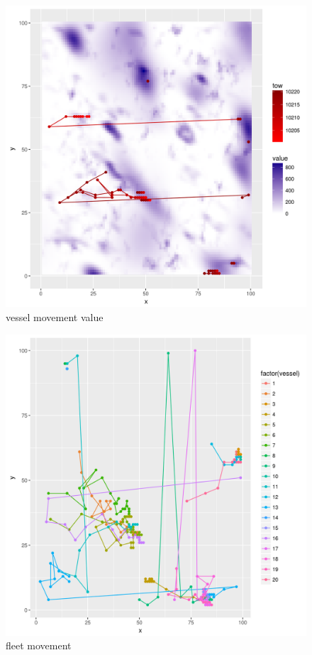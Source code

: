 \documentclass[review]{elsarticle}
\begin{document}
\begin{figure}[!ht]
	\includegraphics[width = \linewidth]{../tests/plots/vessel_move_value}
		\caption{vessel movement value}
\end{figure}	

\begin{figure}[!ht]
	\includegraphics[width = \linewidth]{../tests/plots/fleet_moves}
		\caption{fleet movement}
\end{figure}	
\end{document}
